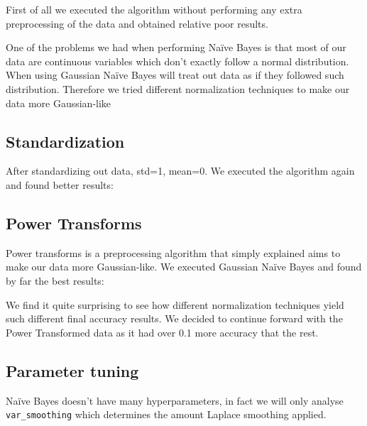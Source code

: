 First of all we executed the algorithm without performing any extra preprocessing of the data and obtained
relative poor results.


One of the problems we had when performing Na\"ive Bayes is that most of our data are continuous variables
which don't exactly follow a normal distribution. When using Gaussian Na\"ive Bayes will treat out data 
as if they followed such distribution. Therefore we tried different normalization techniques to make our
data more Gaussian-like

\subsection{Standardization}

After standardizing out data, std=1, mean=0. We executed the algorithm again and found better results:


\subsection{Power Transforms}
Power transforms is a preprocessing algorithm that simply explained aims to make our data more Gaussian-like. We executed Gaussian Na\"ive Bayes and found by far the best results:


We find it quite surprising to see how different normalization techniques yield such 
different final accuracy results. We decided to continue forward with the Power 
Transformed data as it had over 0.1 more accuracy that the rest.

\subsection{Parameter tuning}

Na\"ive Bayes doesn't have many hyperparameters, in fact we will only analyse \texttt{var\_smoothing} which determines the amount Laplace smoothing applied.

